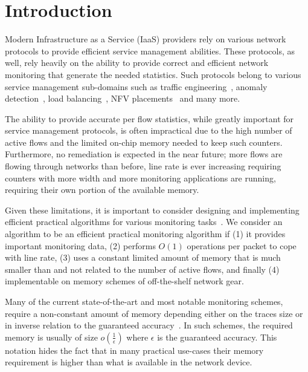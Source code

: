 \section{Introduction}
\label{sec:introduction}

Modern Infrastructure as a Service (IaaS) providers rely on various network protocols to provide efficient service management abilities. These protocols, as well, rely heavily on the ability to provide correct and efficient network monitoring that generate the needed statistics. Such protocols belong to various service management sub-domains such as traffic engineering~\cite{microte}, anomaly detection~\cite{Moraney2016}, load balancing~\cite{networkLB}, NFV placements~\cite{NFV-dor} and many more.

The ability to provide accurate per flow statistics, while greatly important for service management protocols, is often impractical due to the high number of active flows and the limited on-chip memory needed to keep such counters. Furthermore, no remediation is expected in the near future; more flows are flowing through networks than before, line rate is ever increasing requiring counters with more width and more monitoring applications are running, requiring their own portion of the available memory. 

Given these limitations, it is important to consider designing and implementing efficient practical algorithms for various monitoring tasks~\cite{moraney2018, moraney2020}. We consider an algorithm to be an efficient practical monitoring algorithm if (1) it provides important monitoring data, (2) performs $O(1)$ operations per packet to cope with line rate, (3) uses a constant limited amount of memory that is much smaller than and not related to the number of active flows, and finally (4) implementable on memory schemes of off-the-shelf network gear.

Many of the current state-of-the-art and most notable monitoring schemes, require a non-constant amount of memory depending either on the traces size or in inverse relation to the guaranteed accuracy~\cite{slidingHH,metwally2005efficient,SpaceSaving,Ben-Basat2017}. In such schemes, the required memory is usually of size $o(\frac{1}{\epsilon})$ where $\epsilon$ is the guaranteed accuracy. This notation  hides the fact that in many practical use-cases their memory requirement is  higher than what is available in the network device.

